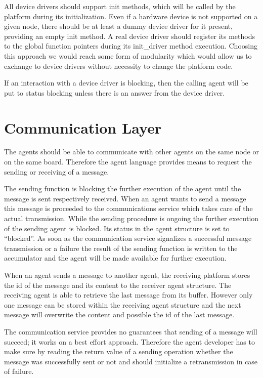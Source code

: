 \documentclass{scrreprt}
\begin{document}
\noindent
All device drivers should support init methods, which will be called by the platform during its initialization. 
Even if a hardware device is not supported on a given node, there should be at least a dummy device driver for it present, 
providing an empty init method. A real device driver should register its methods to the global function pointers during its 
init_driver method execution. Choosing this approach we would reach some form of modularity which would allow us to exchange 
to device drivers without necessity to change the platform code.

\noindent
If an interaction with a device driver is blocking, then the calling agent will be put to status blocking unless there is an answer from
the device driver.

\section{Communication Layer}

The agents should be able to communicate with other agents on the same node or on the same board. Therefore the agent 
language provides means to request the sending or receiving of a message.  


\noindent
The sending function is blocking the further execution of the agent until the message is sent respectively received. 
When an agent wants to send a message this message is proceeded to the communications service which takes care of the 
actual transmission. While the sending procedure is ongoing the further execution of the sending agent is blocked. 
Its status in the agent structure is set to “blocked”. As soon as the communication service signalizes a successful 
message transmission or a failure the result of the sending function is written to the accumulator and the agent will 
be made available for further execution.  


\noindent
When an agent sends a message to another agent, the receiving platform stores the id of the message and its content 
to the receiver agent structure. The receiving agent is able to retrieve the last message from its buffer. 
However only one message can be stored within the receiving agent structure and the next message will overwrite the 
content and possible the id of the last message.  


\noindent
The communication service provides no guarantees that sending of a message will succeed; it works on a best effort 
approach. Therefore the agent developer has to make sure by reading the return value of a sending operation whether 
the message was successfully sent or not and should initialize a retransmission in case of failure. 
\end{document}
